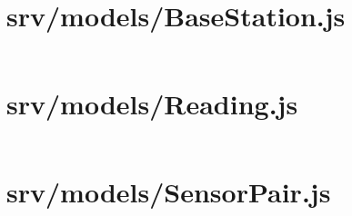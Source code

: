 \section{srv/models/BaseStation.js}
\label{code:srv-basestation-model}
\inputminted{javascript}{../srv/models/BaseStation.js}

\section{srv/models/Reading.js}
\label{code:srv-reading-model}
\inputminted{javascript}{../srv/models/Reading.js}

\section{srv/models/SensorPair.js}
\label{code:srv-sensorpair-model}
\inputminted{javascript}{../srv/models/SensorPair.js}